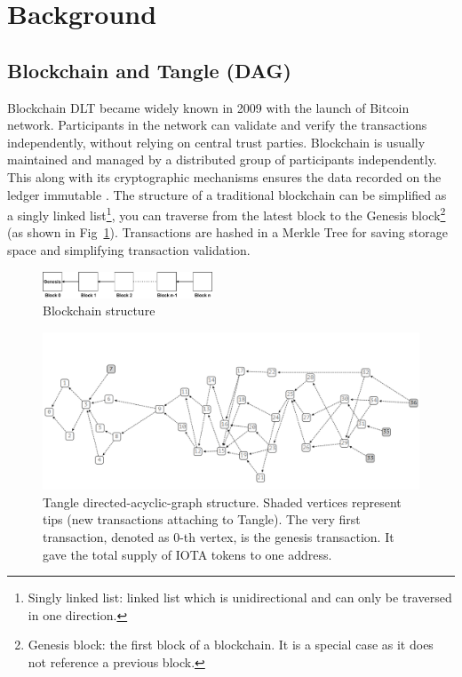 \section{Background}
\label{sec:background}

\subsection{Blockchain and Tangle (DAG)}
Blockchain DLT became widely known in 2009 with the launch of Bitcoin network.
Participants in the network can validate and verify the transactions independently, without relying on central trust parties.
Blockchain is usually maintained and managed by a distributed group of participants independently.
This along with its cryptographic mechanisms ensures the data recorded on the ledger immutable \cite{Yaga2018BlockchainTO}.
The structure of a traditional blockchain can be simplified as a singly linked list\footnote{Singly linked list: linked list which is unidirectional and can only be traversed in one direction.},
you can traverse from the latest block to the Genesis block\footnote{Genesis block: the first block of a blockchain. It is a special case as it does not reference a previous block.} (as shown in Fig~\ref{fig:blockchain_structure}).
Transactions are hashed in a Merkle Tree \cite{merkle1980protocols} for saving storage space and simplifying transaction validation.


\begin{figure}[h]
    \includegraphics[width=0.45\textwidth,trim={-2cm -1cm 0 -1cm},clip]{figs/blockchain_structure.pdf}
    \caption{Blockchain structure}
    \label{fig:blockchain_structure}
\end{figure}

\begin{figure}[t]
    \centering
    \includegraphics[width=\textwidth,trim={-1cm 0 0 2cm},clip]{figs/tangle_structure.png}
    \caption{Tangle directed-acyclic-graph structure. Shaded vertices represent tips (new transactions attaching to Tangle). The very first transaction, denoted as 0-th vertex, is the genesis transaction. It gave the total supply of IOTA tokens to one address.}
    \label{fig:tangle_structure}
\end{figure}

